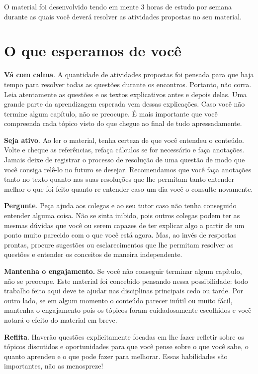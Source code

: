 O material foi desenvolvido tendo em mente 3 horas de estudo por semana durante as quais você deverá resolver as atividades propostas no seu material.

\section{O que esperamos de você}

\textbf{Vá com calma}. A quantidade de atividades propostas foi pensada para que haja tempo para resolver todas as questões durante os encontros. Portanto, não corra. Leia atentamente as questões e os textos explicativos antes e depois delas. Uma grande parte da aprendizagem esperada vem dessas explicações. Caso você não termine algum capítulo, não se preocupe. É mais importante que você compreenda cada tópico visto do que chegue ao final de tudo apressadamente.
 
\textbf{Seja ativo}. Ao ler o material, tenha certeza de que você entendeu o conteúdo. Volte e cheque as referências, refaça cálculos se for necessário e faça anotações. Jamais deixe de registrar o processo de resolução de uma questão de modo que você consiga relê-lo no futuro se desejar. Recomendamos que você faça anotações tanto no texto quanto nas suas resoluções que lhe permitam tanto entender  melhor o que foi feito quanto re-entender caso um dia você o consulte novamente. 

\textbf{Pergunte}. Peça ajuda aos colegas e ao seu tutor caso não tenha conseguido entender alguma coisa. Não se sinta inibido, pois outros colegas podem ter as mesmas dúvidas que você ou serem capazes de ter explicar algo a partir de um ponto muito parecido com o que você está agora. Mas, ao invés de respostas prontas, procure sugestões ou esclarecimentos que lhe permitam resolver as questões e entender os conceitos de maneira independente.

\textbf{Mantenha o engajamento.} Se você não conseguir terminar algum capítulo, não se preocupe. Este material foi concebido pensando nessa possibilidade: todo trabalho feito aqui deve te ajudar nas disciplinas principais cedo ou tarde. Por outro lado, se em algum momento o conteúdo parecer inútil ou muito fácil, mantenha o engajamento pois os tópicos foram cuidadosamente escolhidos e vocẽ notará o efeito do material em breve.

\textbf{Reflita}. Haverão questões explicitamente focadas em lhe fazer refletir sobre os tópicos discutidos e oportunidades para que você pense sobre o que você sabe, o quanto aprendeu e o que pode fazer para melhorar. Essas habilidades são importantes, não as menospreze! 

